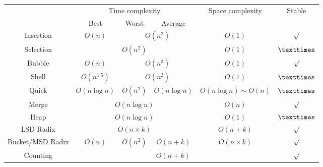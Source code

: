 \begin{enumerate}
\begin{table}[H]
\begin{tabular}{|c|c|c|c|c|c|}
            \Xhline{3\arrayrulewidth}
            \multirow{2}{*}{Method} & \multicolumn{3}{c|}{Time complexity} & \multirow{2}{*}{Space complexity} & \multirow{2}{*}{Stable} \\
            \cline{2-4}
            & Best & Worst & Average & & \\
            \Xhline{2\arrayrulewidth}
            Insertion & $O(n)$ & \multicolumn{2}{c|}{$O(n^2)$} & $O(1)$ & $\surd$ \\
            \hline
            Selection & \multicolumn{3}{c|}{$O(n^2)$} & $O(1)$ & $\texttimes$ \\
            \hline
            Bubble & $O(n)$ & \multicolumn{2}{c|}{$O(n^2)$} & $O(1)$ & $\surd$ \\
            \hline
            Shell & $O(n^{1.5})$ & \multicolumn{2}{c|}{$O(n^2)$} & $O(1)$ & $\texttimes$ \\
            \hline
            Quick & $O(n\log n)$ & $O(n^2)$ & $O(n\log n)$ & $O(n\log n) \sim O(n)$ & $\texttimes$ \\
            \hline
            Merge & \multicolumn{3}{c|}{$O(n\log n)$} & $O(n)$ & $\surd$ \\
            \hline
            Heap & \multicolumn{3}{c|}{$O(n\log n)$} & $O(1)$ & $\texttimes$ \\
            \hline
            LSD Radix & \multicolumn{3}{c|}{$O(n \times k)$} & $O(n + k)$ & $\surd$ \\
            \hline
            Bucket/MSD Radix & $O(n)$ & $O(n^2)$ & $O(n + k)$ & $O(n \times k)$ & $\surd$ \\
            \hline
            Counting & \multicolumn{4}{c|}{$O(n + k)$} & $\surd$ \\
            \hline
        \end{tabular}
    \end{table}
\end{enumerate}

\pagebreak